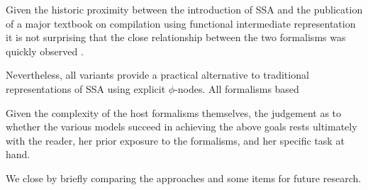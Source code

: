 Given the historic proximity between the introduction of SSA and the
publication of a major textbook on compilation using functional
intermediate representation it is not surprising that the close
relationship between the two formalisms was quickly observed
\cite{Kelsey95}.

 Nevertheless,
all variants provide a practical alternative to traditional
representations of SSA using explicit $\phi$-nodes. All formalisms
based 


 Given the complexity of the host formalisms
themselves, the judgement as to whether the various models succeed in
achieving the above goals rests ultimately with the reader, her prior
exposure to the formalisms, and her specific task at hand.

We close by briefly comparing the approaches and some items for future
research.

%
%
